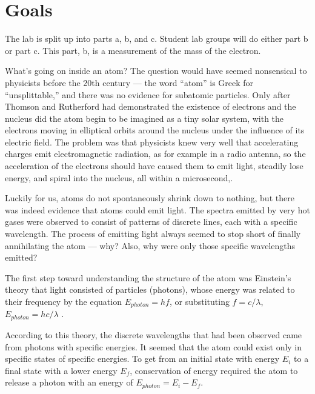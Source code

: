 \addtocounter{chapter}{-1}
\renewcommand\thechapter{\arabic{chapter}b}
\label{lab:hydrogen}
\renewcommand\thechapter{\arabic{chapter}}

\apparatus
{}

\section*{Goals}

The lab is split up into parts a, b, and c. Student lab groups will do
either part b or part c. This part, b, is a measurement of the mass of the electron.

\introduction

What's going on inside an atom? The question would have
seemed nonsensical to physicists before the 20th century ---
the word ``atom'' is Greek for ``unsplittable,'' and there
was no evidence for subatomic particles. Only after Thomson
and Rutherford had demonstrated the existence of electrons
and the nucleus did the atom begin to be imagined as a tiny
solar system, with the electrons moving in elliptical orbits
around the nucleus under the influence of its electric
field. The problem was that physicists knew very well that
accelerating charges emit electromagnetic radiation, as for
example in a radio antenna, so the acceleration of the
electrons should have caused them to emit light, steadily
lose energy, and spiral into the nucleus, all within a microsecond,.

Luckily for us, atoms do not spontaneously shrink down to
nothing, but there was indeed evidence that atoms could emit
light. The spectra emitted by very hot gases were observed
to consist of patterns of discrete lines, each with a
specific wavelength. The process of emitting light always
seemed to stop short of finally annihilating the atom ---
why? Also, why were only those specific wavelengths emitted?

The first step toward understanding the structure of the atom was
Einstein's theory that light consisted of particles
(photons), whose energy was related to their frequency by
the equation $E_{photon}=hf$, or substituting
$f=c/\lambda$, $E_{photon}=hc/\lambda$  .

According to this theory, the discrete wavelengths that had
been observed came from photons with specific energies. It
seemed that the atom could exist only in specific states of
specific energies. To get from an initial state with energy
$E_i$ to a final state with a lower energy $E_f$, conservation
of energy required the atom to release a photon with an
energy of $E_{photon}=E_i-E_f$. 

